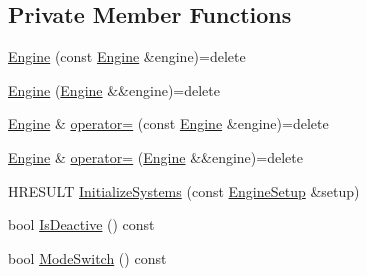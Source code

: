\subsection*{Private Member Functions}
\begin{DoxyCompactItemize}
\item 
\hyperlink{classmage_1_1_engine_afd2f4f32b2e803f59521aafe1924f0ba}{Engine} (const \hyperlink{classmage_1_1_engine}{Engine} \&engine)=delete
\item 
\hyperlink{classmage_1_1_engine_a275b668202a24e639ebe3056a1c845a3}{Engine} (\hyperlink{classmage_1_1_engine}{Engine} \&\&engine)=delete
\item 
\hyperlink{classmage_1_1_engine}{Engine} \& \hyperlink{classmage_1_1_engine_a1eedff82d4c8207c61676230520648fd}{operator=} (const \hyperlink{classmage_1_1_engine}{Engine} \&engine)=delete
\item 
\hyperlink{classmage_1_1_engine}{Engine} \& \hyperlink{classmage_1_1_engine_a22607a263e0be5e179cc0e4bf13b18f7}{operator=} (\hyperlink{classmage_1_1_engine}{Engine} \&\&engine)=delete
\item 
H\+R\+E\+S\+U\+LT \hyperlink{classmage_1_1_engine_a2d0a2669520cce1316a176cc3e891502}{Initialize\+Systems} (const \hyperlink{structmage_1_1_engine_setup}{Engine\+Setup} \&setup)
\item 
bool \hyperlink{classmage_1_1_engine_a83c3ed26138932f8b17daa20526b100e}{Is\+Deactive} () const
\item 
bool \hyperlink{classmage_1_1_engine_a54cb08ec26da300b0c7ca4e7f9a35e0b}{Mode\+Switch} () const
\end{DoxyCompactItemize}
